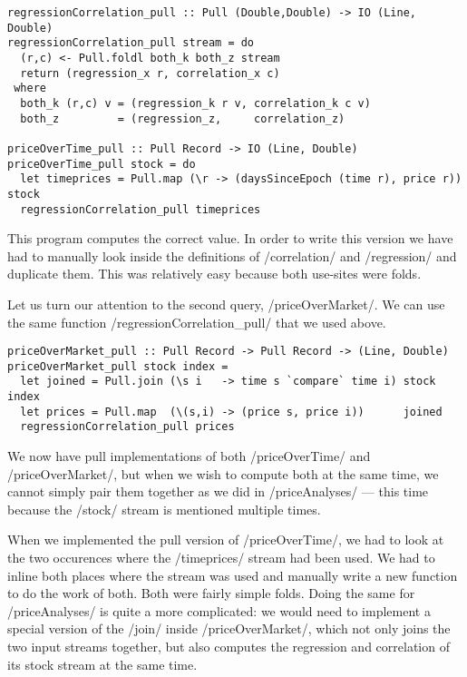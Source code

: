 \begin{lstlisting}
regressionCorrelation_pull :: Pull (Double,Double) -> IO (Line, Double)
regressionCorrelation_pull stream = do
  (r,c) <- Pull.foldl both_k both_z stream
  return (regression_x r, correlation_x c)
 where
  both_k (r,c) v = (regression_k r v, correlation_k c v)
  both_z         = (regression_z,     correlation_z)

priceOverTime_pull :: Pull Record -> IO (Line, Double)
priceOverTime_pull stock = do
  let timeprices = Pull.map (\r -> (daysSinceEpoch (time r), price r)) stock
  regressionCorrelation_pull timeprices
\end{lstlisting}


This program computes the correct value.
In order to write this version we have had to manually look inside the definitions of \Hs/correlation/ and \Hs/regression/ and duplicate them.
This was relatively easy because both use-sites were folds.


Let us turn our attention to the second query, \Hs/priceOverMarket/.
We can use the same function \Hs/regressionCorrelation_pull/ that we used above.

\begin{lstlisting}
priceOverMarket_pull :: Pull Record -> Pull Record -> (Line, Double)
priceOverMarket_pull stock index =
  let joined = Pull.join (\s i   -> time s `compare` time i) stock index
  let prices = Pull.map  (\(s,i) -> (price s, price i))      joined
  regressionCorrelation_pull prices
\end{lstlisting}

We now have pull implementations of both \Hs/priceOverTime/ and \Hs/priceOverMarket/, but when we wish to compute both at the same time, we cannot simply pair them together as we did in \Hs/priceAnalyses/ --- this time because the \Hs/stock/ stream is mentioned multiple times.

When we implemented the pull version of \Hs/priceOverTime/, we had to look at the two occurences where the \Hs/timeprices/ stream had been used.
We had to inline both places where the stream was used and manually write a new function to do the work of both.
Both were fairly simple folds.
Doing the same for \Hs/priceAnalyses/ is quite a more complicated: we would need to implement a special version of the \Hs/join/ inside \Hs/priceOverMarket/, which not only joins the two input streams together, but also computes the regression and correlation of its stock stream at the same time.

